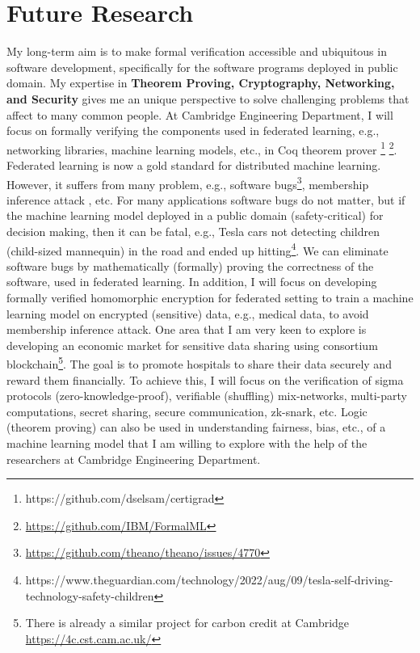 \documentclass[a4paper]{article}
\begin{document}
\section{Future Research}
My long-term aim is to make formal verification accessible and ubiquitous in 
software development, specifically for the software programs deployed in public domain.
My expertise in \textbf{Theorem Proving, Cryptography, Networking, and Security}
gives me an unique perspective to solve challenging problems that affect
to many common people. At Cambridge Engineering Department, 
I will focus on formally verifying the components
used in federated learning, e.g., networking libraries, 
machine learning models, etc.,  in Coq theorem 
prover \cite{10.5555/3305890.3305996}\footnote{https://github.com/dselsam/certigrad}
\cite{vajjha_et_al:LIPIcs.ITP.2022.31}\footnote{\url{https://github.com/IBM/FormalML}}.
Federated learning is now 
a gold standard for distributed machine learning. However, it suffers from 
many problem, e.g., software bugs\footnote{\url{https://github.com/theano/theano/issues/4770}}, 
membership inference attack \cite{shokri2017membership}, etc. For many 
applications software bugs do not matter, but if the machine learning model 
deployed in a public domain (safety-critical) for decision making, then 
it can be fatal, e.g., Tesla cars not detecting children 
(child-sized mannequin) in the road and ended up 
hitting\footnote{https://www.theguardian.com/technology/2022/aug/09/tesla-self-driving-technology-safety-children}. 
We can eliminate software bugs 
by mathematically (formally) proving the correctness of the software, used 
in federated learning. In addition, I will focus on developing formally verified 
homomorphic encryption for federated setting to train a machine learning 
model on encrypted (sensitive) data, e.g., medical data, to avoid 
membership inference attack.
One area that I am very keen to explore is 
developing an economic market for sensitive data sharing using consortium 
blockchain\footnote{There is already a similar project for carbon credit at Cambridge \url{https://4c.cst.cam.ac.uk/}}.
The goal is to promote hospitals to share their data securely
and reward them financially. 
To achieve this, I will focus on the verification of
sigma protocols (zero-knowledge-proof), verifiable (shuffling) mix-networks, 
multi-party computations, secret sharing, secure communication, zk-snark, etc. 
Logic (theorem proving) can also be used in understanding fairness, bias, etc.,
of a machine learning model that I am willing to explore with the help of 
the researchers at Cambridge Engineering Department.
\end{document}
